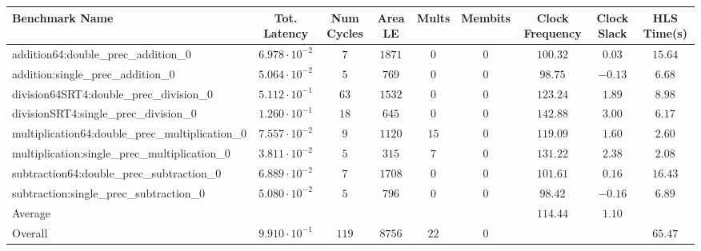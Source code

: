 \begin{tabular}{|l|c|c|c|c|c|c|c|c|}
\hline
Benchmark Name                                   & Tot. Latency            & Num Cycles & Area LE  & Mults  & Membits & Clock Frequency & Clock Slack & HLS Time(s) \\
\hline
addition64:double\_prec\_addition\_0             & $ 6.978 \cdot 10^{-2} $ & $ 7      $ & $ 1871 $ & $ 0  $ & $ 0   $ & $ 100.32      $ & $ 0.03    $ & $ 15.64   $ \\
addition:single\_prec\_addition\_0               & $ 5.064 \cdot 10^{-2} $ & $ 5      $ & $ 769  $ & $ 0  $ & $ 0   $ & $ 98.75       $ & $ -0.13   $ & $ 6.68    $ \\
division64SRT4:double\_prec\_division\_0         & $ 5.112 \cdot 10^{-1} $ & $ 63     $ & $ 1532 $ & $ 0  $ & $ 0   $ & $ 123.24      $ & $ 1.89    $ & $ 8.98    $ \\
divisionSRT4:single\_prec\_division\_0           & $ 1.260 \cdot 10^{-1} $ & $ 18     $ & $ 645  $ & $ 0  $ & $ 0   $ & $ 142.88      $ & $ 3.00    $ & $ 6.17    $ \\
multiplication64:double\_prec\_multiplication\_0 & $ 7.557 \cdot 10^{-2} $ & $ 9      $ & $ 1120 $ & $ 15 $ & $ 0   $ & $ 119.09      $ & $ 1.60    $ & $ 2.60    $ \\
multiplication:single\_prec\_multiplication\_0   & $ 3.811 \cdot 10^{-2} $ & $ 5      $ & $ 315  $ & $ 7  $ & $ 0   $ & $ 131.22      $ & $ 2.38    $ & $ 2.08    $ \\
subtraction64:double\_prec\_subtraction\_0       & $ 6.889 \cdot 10^{-2} $ & $ 7      $ & $ 1708 $ & $ 0  $ & $ 0   $ & $ 101.61      $ & $ 0.16    $ & $ 16.43   $ \\
subtraction:single\_prec\_subtraction\_0         & $ 5.080 \cdot 10^{-2} $ & $ 5      $ & $ 796  $ & $ 0  $ & $ 0   $ & $ 98.42       $ & $ -0.16   $ & $ 6.89    $ \\
\hline
Average                                          & $                     $ & $        $ & $      $ & $    $ & $     $ & $ 114.44      $ & $ 1.10    $ & $         $ \\
\hline
Overall                                          & $ 9.910 \cdot 10^{-1} $ & $ 119    $ & $ 8756 $ & $ 22 $ & $ 0   $ & $             $ & $         $ & $ 65.47   $ \\
\hline
\end{tabular}
